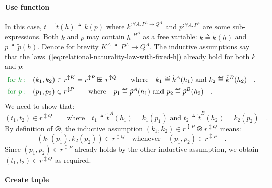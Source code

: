 \paragraph{Use function}

In this case, $t=\tilde{t}(h)\triangleq k(p)$ where $k^{:\forall A.\,P^{A}\rightarrow Q^{A}}$
and $p^{:\forall A.\,P^{A}}$ are some sub-expressions. Both $k$
and $p$ may contain $h^{:H^{A}}$ as a free variable: $k\triangleq\tilde{k}(h)$
and $p\triangleq\tilde{p}(h)$. Denote for brevity $K^{A}\triangleq P^{A}\rightarrow Q^{A}$.
The inductive assumptions say that the laws~(\ref{eq:relational-naturality-law-with-fixed-h})
already hold for both $k$ and $p$:
\begin{align*}
{\color{greenunder}\text{for }k:}\quad & (k_{1},k_{2})\in r^{\updownarrow K}=r^{\updownarrow P}\ogreaterthan r^{\updownarrow Q}\quad\quad\text{where}\quad k_{1}\triangleq\tilde{k}^{A}(h_{1})\text{ and }k_{2}\triangleq\tilde{k}^{B}(h_{2})\quad,\\
{\color{greenunder}\text{for }p:}\quad & (p_{1},p_{2})\in r^{\updownarrow P}\quad\quad\text{where}\quad p_{1}\triangleq\tilde{p}^{A}(h_{1})\text{ and }p_{2}\triangleq\tilde{p}^{B}(h_{2})\quad.
\end{align*}
We need to show that:
\[
(t_{1},t_{2})\in r^{\updownarrow Q}\quad\quad\text{where}\quad t_{1}\triangleq\tilde{t}^{A}(h_{1})=k_{1}(p_{1})\text{ and }t_{2}\triangleq\tilde{t}^{B}(h_{2})=k_{2}(p_{2})\quad.
\]
By definition of $\ogreaterthan$, the inductive assumption $(k_{1},k_{2})\in r^{\updownarrow P}\ogreaterthan r^{\updownarrow Q}$
means:
\[
(k_{1}(p_{1}),k_{2}(p_{2}))\in r^{\updownarrow Q}\quad\text{whenever}\quad(p_{1},p_{2})\in r^{\updownarrow P}\quad.
\]
Since $(p_{1},p_{2})\in r^{\updownarrow P}$ already holds by the
other inductive assumption, we obtain $(t_{1},t_{2})\in r^{\updownarrow Q}$
as required.

\paragraph{Create tuple}

